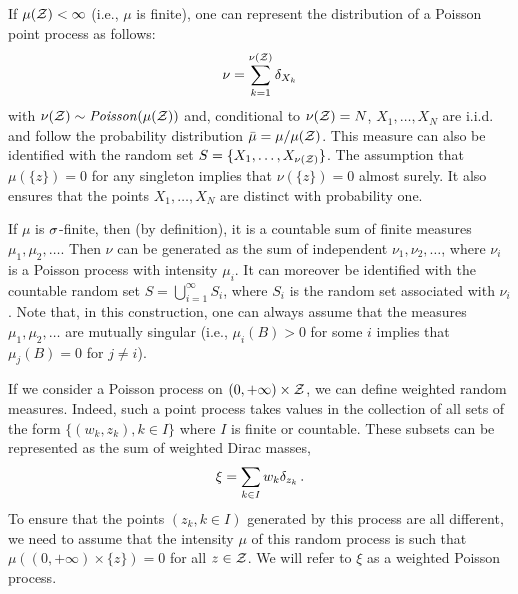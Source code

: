 If $\mu({\mathcal Z})<\infty$ (i.e., $\mu$ is finite), one can represent the distribution of a Poisson point process as follows:
\[
\nu = \sum_{k=1}^{\nu({\mathcal Z})} \delta_{X_k}
\]
with
 $\nu({\mathcal Z})\sim \mathit{Poisson}(\mu({\mathcal Z}))$ and, conditional to $\nu({\mathcal Z}) = N$, $X_1, \ldots, X_N$ are i.i.d. and follow the probability distribution $\bar\mu = \mu /\mu({\mathcal Z})$. This measure can also be identified with the random set $S = \{X_1, \ldots, X_{\nu({\mathcal Z})}\}$. The assumption that $\mu(\{z\}) = 0$ for any singleton implies that $\nu(\{z\}) = 0$ almost surely. It also ensures that the points $X_1, \ldots, X_N$ are distinct with probability one.
 
 If $\mu$ is $\sigma$-finite, then (by definition), it is a countable sum of finite measures $\mu_1, \mu_2, \ldots$. Then $\nu$ can  be generated as the sum of independent $\nu_1, \nu_2, \ldots$, where $\nu_i$ is a Poisson process with intensity $\mu_i$. It can moreover be identified with the countable random set
 $ S = \bigcup_{i=1}^\infty S_i$, where $S_i$ is the random set associated with $\nu_i$. Note that, in this construction, one can always assume that the measures $\mu_1, \mu_2, \ldots$ are mutually singular (i.e., $\mu_i(B) > 0$ for some $i$ implies that $\mu_j(B) = 0$ for $j\neq i$). 
\bigskip


If we consider a Poisson process on $(0, +\infty) \times {\mathcal Z}$, we can define weighted random measures.  Indeed, such a point process takes values in the collection of all sets of the form $\{(w_k, z_k), k\in I \}$ where $I$ is finite or countable. These subsets can be represented as the  sum of weighted Dirac masses, 
\[
\xi = \sum_{k\in I} w_k \delta_{z_k}\,.
\]
To ensure that the points $(z_k, k\in I)$ generated by this process are all different, we need to assume that the intensity $\mu$ of this random process is such that $\mu((0, +\infty) \times \{z\}) = 0$ for all $z\in {\mathcal Z}$. We will refer to $\xi$ as a weighted Poisson process. 


\bigskip

